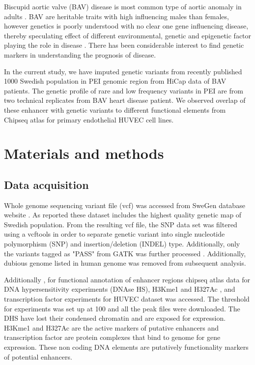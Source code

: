 \documentclass[10pt]{article} %
\begin{document}
Biscupid aortic valve (BAV) disease  is most common type of aortic anomaly in adults \cite{siu2010bicuspid}. BAV are heritable traits with high influencing males than females, however genetics is poorly understood with no clear one gene influencing disease, thereby speculating effect of different environmental, genetic and epigenetic factor playing the role in disease \cite{siu2010bicuspid,mordi2012bicuspid}. There has been considerable interest to find genetic markers in understanding the prognosis of disease. 

In the current study, we have imputed genetic variants from recently published 1000 Swedish population  \cite{swegen}  in PEI  genomic region from HiCap data of BAV patients. The genetic profile of rare and low frequency variants in PEI  are from two technical replicates from BAV heart disease patient. We observed overlap of these enhancer with genetic variants to different functional elements from Chipseq atlas for primary endothelial HUVEC cell lines.


\section{Materials and methods}

\subsection{Data acquisition}

Whole genome sequencing variant file (vcf) was accessed from SweGen \cite{swegen} database website \cite{Sewfreq}. As reported these dataset includes the highest quality genetic map of Swedish population. From the resulting vcf file, the SNP data set was filtered using a vcftools \cite{danecek2011variant} in order to separate  genetic variant into single nucleotide polymorphism (SNP) and  insertion/deletion (INDEL) type. Additionally,  only the variants tagged as "PASS" from GATK \cite{gatk2} was further processed . Additionally, dubious genome listed in human genome \cite{li2014toward}  was removed from subsequent analysis.

Additionally , for functional annotation of enhancer regions chipseq atlas \cite{Ohta} data  for DNA hypersensitivity experiments (DNAse HS), H3Kme1  and H327Ac , and transcription factor experiments for HUVEC dataset was accessed. The threshold for experiments was set up at 100 and all the peak files were downloaded.  The DHS have lost their condensed chromatin and are exposed for expression. H3Kme1 and H327Ac are the active markers of  putative enhancers and transcription factor are protein complexes that bind to genome for gene expression. These non coding DNA elements  are putatively functionality markers of potential enhancers. 
\end{document}
